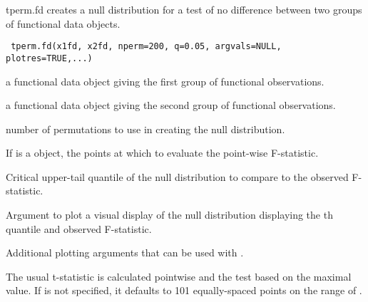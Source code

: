 \begin{Description}\relax
tperm.fd creates a null distribution for a test of no difference between two
groups of functional data objects.
\end{Description}
\begin{Usage}
\begin{verbatim}
 tperm.fd(x1fd, x2fd, nperm=200, q=0.05, argvals=NULL, plotres=TRUE,...)
\end{verbatim}
\end{Usage}
\begin{Arguments}
\begin{ldescription}
\item[\code{x1fd}] a functional data object giving the first group of functional observations.

\item[\code{x2fd}] a functional data object giving the second group of functional
observations.

\item[\code{nperm}] number of permutations to use in creating the null distribution.

\item[\code{argvals}] If  is a  object, the points at which to evaluate
the point-wise F-statistic.

\item[\code{q}] Critical upper-tail quantile of the null distribution to compare to the observed F-statistic.

\item[\code{plotres}] Argument to plot a visual display of the null distribution displaying the
th quantile and observed F-statistic.

\item[\code{...}] Additional plotting arguments that can be used with .

\end{ldescription}
\end{Arguments}
\begin{Details}\relax
The usual t-statistic is calculated pointwise and the test based on the
maximal value. If  is not specified,
it defaults to 101 equally-spaced points on the range of .
\end{Details}
